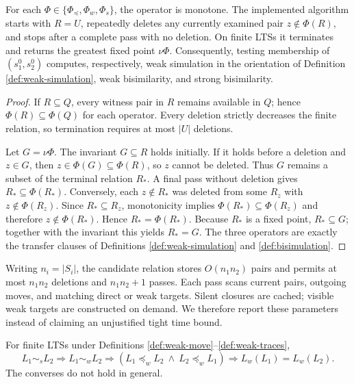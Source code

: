 \documentclass{ws-jbcb}
\numberwithin{equation}{section}
\newcommand{\strongsim}{\mathrel{\sim_{s}}}
\newcommand{\weaksim}{\mathrel{\sim_{w}}}
\newcommand{\weakpre}{\mathrel{\preceq_{w}}}
\begin{document}
\begin{theorem}\label{thm:fixed-point}
For each $\Phi\in\{\Phi_{\preceq},\Phi_w,\Phi_s\}$, the operator is monotone.
The implemented algorithm starts with $R=U$, repeatedly deletes any currently
examined pair $z\notin\Phi(R)$, and stops after a complete pass with no deletion.
On finite LTSs it terminates and returns the greatest fixed point $\nu\Phi$.
Consequently, testing membership of $(s_1^0,s_2^0)$ computes, respectively,
weak simulation in the orientation of Definition \ref{def:weak-simulation}, weak
bisimilarity, and strong bisimilarity.
\end{theorem}

\begin{proof}
If $R\subseteq Q$, every witness pair in $R$ remains available in $Q$; hence
$\Phi(R)\subseteq\Phi(Q)$ for each operator. Every deletion strictly decreases
the finite relation, so termination requires at most $|U|$ deletions.

Let $G=\nu\Phi$. The invariant $G\subseteq R$ holds initially. If it holds before
a deletion and $z\in G$, then
$z\in\Phi(G)\subseteq\Phi(R)$, so $z$ cannot be deleted. Thus $G$ remains a
subset of the terminal relation $R_*$. A final pass without deletion gives
$R_*\subseteq\Phi(R_*)$. Conversely, each $z\notin R_*$ was deleted from some
$R_z$ with $z\notin\Phi(R_z)$. Since $R_*\subseteq R_z$, monotonicity implies
$\Phi(R_*)\subseteq\Phi(R_z)$ and therefore $z\notin\Phi(R_*)$. Hence
$R_*=\Phi(R_*)$. Because $R_*$ is a fixed point, $R_*\subseteq G$; together
with the invariant this yields $R_*=G$. The three operators are exactly the
transfer clauses of Definitions \ref{def:weak-simulation} and
\ref{def:bisimulation}.
\end{proof}

\begin{remark}\label{rem:complexity}
Writing $n_i=|S_i|$, the candidate relation stores $O(n_1n_2)$ pairs and permits
at most $n_1n_2$ deletions and $n_1n_2+1$ passes. Each pass scans current pairs,
outgoing moves, and matching direct or weak targets. Silent closures are cached;
visible weak targets are constructed on demand. We therefore report these
parameters instead of claiming an unjustified tight time bound.
\end{remark}

\begin{proposition}\label{prop:hierarchy}
For finite LTSs under Definitions \ref{def:weak-move}--\ref{def:weak-traces},
\begin{equation}\label{eq:hierarchy}
L_1\strongsim L_2
\Longrightarrow L_1\weaksim L_2
\Longrightarrow
(L_1\weakpre L_2\ \land\ L_2\weakpre L_1)
\Longrightarrow L_w(L_1)=L_w(L_2).
\end{equation}
The converses do not hold in general.
\end{proposition}
\end{document}
